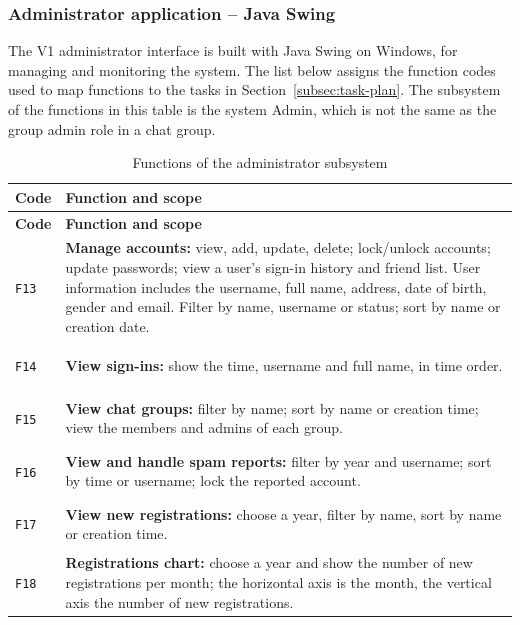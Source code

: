 \subsubsection{Administrator application -- Java Swing}
\label{subsubsec:client-admin}

The V1 administrator interface is built with Java Swing on Windows, for managing
and monitoring the system. The list below assigns the function codes used to map
functions to the tasks in Section~\ref{subsec:task-plan}.
The subsystem of the functions in this table is the system Admin, which is not the
same as the group admin role in a chat group.

\begingroup
\small
\begin{longtable}{|C{1.2cm}|L{\dimexpr\textwidth-1.2cm-4\arrayrulewidth\relax}|}
  \caption{Functions of the administrator subsystem}
  \label{tab:admin-features}\\
  \hline
  \textbf{Code} & \textbf{Function and scope}\\
  \hline
  \endfirsthead
  \hline
  \textbf{Code} & \textbf{Function and scope}\\
  \hline
  \endhead
  \hypertarget{F13}{\texttt{F13}} &
  \textbf{Manage accounts:} view, add, update, delete; lock/unlock accounts;
  update passwords; view a user's sign-in history and friend list.
  User information includes the username, full name, address, date of birth,
  gender and email.
  Filter by name, username or status; sort by name or creation date.\\
  \hline
  \hypertarget{F14}{\texttt{F14}} &
  \textbf{View sign-ins:} show the time, username and full name,
  in time order.\\
  \hline
  \hypertarget{F15}{\texttt{F15}} &
  \textbf{View chat groups:} filter by name; sort by name or creation time;
  view the members and admins of each group.\\
  \hline
  \hypertarget{F16}{\texttt{F16}} &
  \textbf{View and handle spam reports:} filter by year and username;
  sort by time or username; lock the reported account.\\
  \hline
  \hypertarget{F17}{\texttt{F17}} &
  \textbf{View new registrations:} choose a year, filter by name,
  sort by name or creation time.\\
  \hline
  \hypertarget{F18}{\texttt{F18}} &
  \textbf{Registrations chart:} choose a year and show the number of new
  registrations per month; the horizontal axis is the month, the vertical axis
  the number of new registrations.\\

\end{longtable}
